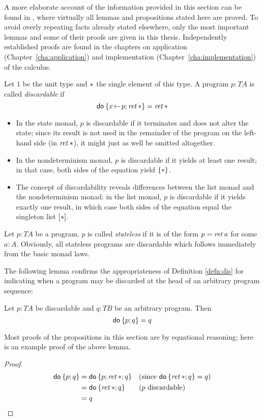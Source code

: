 A more elaborate account of the information provided in this section can be
found in \cite{SchroederMossakowski:PDL}, where virtually all lemmas and
propositions stated here are proved. To avoid overly repeating facts already
stated elsewhere, only the most important lemmas and some of their proofs are
given in this thesis. 
Independently established proofs are found in the chapters on application
(Chapter~\ref{cha:application}) and implementation
(Chapter~\ref{cha:implementation}) of the calculus.

\begin{defn}
  \label{defn:dis}
  Let $1$ be the unit type and $\ast$ the single element of this type. A
  program $p : T A$ is called \emph{discardable} if
  \[ \mathsf{do}\: \{x\!\gets\! p; \mathit{ret\,} \ast\} = \mathit{ret\,} \ast \]
  \begin{itemize}
  \item In the state monad, $p$ is discardable if it terminates and does not
    alter the state; since its result is not used in the remainder of the
    program on the left-hand side (\IE in $\mathit{ret\,} \ast$), it might just as well
    be omitted altogether.
  \item In the nondeterminism monad, $p$ is discardable if it yields at least
    one result; in that case, both sides of the equation yield $\{\ast\}$.
  \item The concept of discardability reveals differences between the list monad
    and the nondeterminism monad: in the list monad, $p$ is discardable if it
    yields exactly one result, in which case both sides of the equation equal
    the singleton list $[\ast]$.
  \end{itemize}
\end{defn}

\begin{defn}
  Let $p : T A$ be a program. $p$ is called \emph{stateless} if it is of the
  form $p = \mathit{ret\,} a$ for some $a : A$. Obviously, all stateless programs are
  discardable which follows immediately from the basic monad laws.
\end{defn}

The following lemma confirms the appropriateness of Definition \ref{defn:dis}
for indicating when a program may be discarded at the head of an arbitrary
program sequence:
\begin{lem}
  \label{thm:dis-general}
  Let $p: T A$ be discardable and $q : T B$ be an arbitrary program. Then
  \[ \mathsf{do}\: \{p; q\} = q \]
\end{lem}
Most proofs of the propositions in this section are by equational reasoning;
here is an example proof of the above lemma.
\begin{proof}
  \begin{align*}
    \mathsf{do}\: \{p; q\} &= \mathsf{do}\: \{p; \mathit{ret\,}\ast; q\}  && \text{(since
      $\mathsf{do}\: \{\mathit{ret\,}\ast; q\} = q$)}\\
                  &= \mathsf{do}\: \{\mathit{ret\,}\ast; q\} && \text{($p$ discardable)}\\
                  &= q
  \end{align*}
\end{proof}

